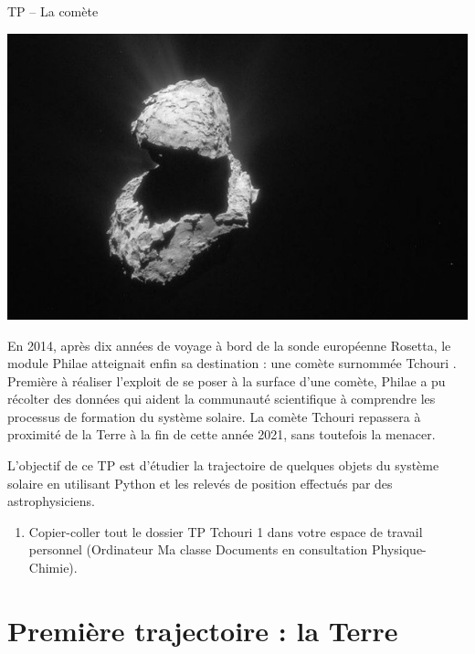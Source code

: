 \documentclass[12pt,a4paper]{article}
\begin{document}
\begin{header}
TP -- La comète
\end{header}

\begin{multicols}{2}
\begin{center}
\includegraphics[width=\linewidth]{images/tchouri3.jpg}
\end{center}

En 2014, après dix années de voyage à bord de la sonde européenne Rosetta, le module Philae atteignait enfin sa destination : une comète surnommée \og Tchouri \fg{}.
Première à réaliser l'exploit de se poser à la surface d'une comète, Philae a pu récolter des données qui aident la communauté scientifique à comprendre les processus de formation du système solaire.
La comète Tchouri repassera à proximité de la Terre à la fin de cette année 2021, sans toutefois la menacer.
\end{multicols}

L'objectif de ce TP est d'étudier la trajectoire de quelques objets du système solaire en utilisant Python et les relevés de position effectués par des astrophysiciens.

\begin{enumerate}
\item \rea{}

Copier-coller tout le dossier \og TP Tchouri 1 \fg{} dans votre espace de travail personnel (Ordinateur \textrightarrow{} Ma classe \textrightarrow{} Documents en consultation \textrightarrow{} Physique-Chimie).
\end{enumerate}

\section*{Première trajectoire : la Terre}
\end{document}
